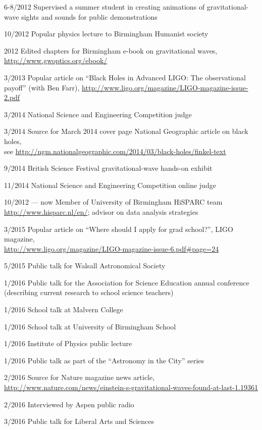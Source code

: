 \documentclass[margin,line]{res}
\begin{document}
\begin{resume}
6-8/2012	Supervised a summer student in creating animations of gravitational-wave sights and sounds for public demonstrations

10/2012	Popular physics lecture to Birmingham Humanist society

2012		Edited chapters for Birmingham e-book on gravitational waves, \url{http://www.gwoptics.org/ebook/}
	  
3/2013	Popular article on ``Black Holes in Advanced LIGO: The observational payoff'' (with Ben Farr), \url{http://www.ligo.org/magazine/LIGO-magazine-issue-2.pdf}

3/2014	National Science and Engineering Competition judge

3/2014	Source for March 2014 cover page National Geographic article on black holes,\\ see \url{http://ngm.nationalgeographic.com/2014/03/black-holes/finkel-text}

9/2014	British Science Festival gravitational-wave hands-on exhibit

11/2014	National Science and Engineering Competition online judge

10/2012 --- now 	Member of University of Birmingham HiSPARC team \url{http://www.hisparc.nl/en/}; advisor on data analysis strategies

3/2015	Popular article on ``Where should I apply for grad school?'', LIGO magazine,\\ \url{http://www.ligo.org/magazine/LIGO-magazine-issue-6.pdf\#page=24}

5/2015 	Public talk for Walsall Astronomical Society

1/2016	Public talk for the Association for Science Education annual conference (describing current research to school science teachers)

1/2016 	School talk at Malvern College

1/2016 	School talk at University of Birmingham School

1/2016	Institute of Physics public lecture

1/2016	Public talk as part of the ``Astronomy in the City'' series

2/2016	Source for Nature magazine news article,\\ \url{http://www.nature.com/news/einstein-s-gravitational-waves-found-at-last-1.19361}

2/2016	Interviewed by Aspen public radio

3/2016	Public talk for Liberal Arts and Sciences 


\end{resume}
\end{document}
